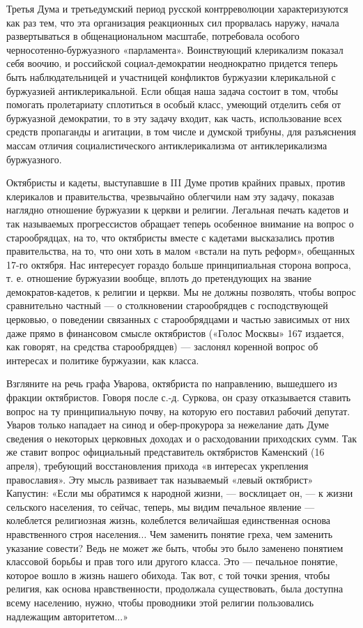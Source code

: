 \documentclass[12pt]{article}
\newcommand{\parnum}{(\arabic{parcount})}
\newcounter{parcount}
\newenvironment{parnumbers}{%
  \par%
  \everypar{\noindent \stepcounter{parcount}\marginpar[]{\parnum}}%
}{}
\begin{document}
\begin{parnumbers}
Третья Дума и третьедумский период русской контрреволюции характеризуются как раз тем, что эта организация реакционных сил прорвалась наружу, начала развертываться в общенациональном масштабе, потребовала особого черносотенно-буржуазного «парламента». Воинствующий клерикализм показал себя воочию, и российской социал-демократии неоднократно придется теперь быть наблюдательницей и участницей конфликтов буржуазии клерикальной с буржуазией антиклерикальной. Если общая наша задача состоит в том, чтобы помогать пролетариату сплотиться в особый класс, умеющий отделить себя от буржуазной демократии, то в эту задачу входит, как часть, использование всех средств пропаганды и агитации, в том числе и думской трибуны, для разъяснения массам отличия социалистического антиклерикализма от антиклерикализма буржуазного.

Октябристы и кадеты, выступавшие в III Думе против крайних правых, против клерикалов и правительства, чрезвычайно облегчили нам эту задачу, показав наглядно отношение буржуазии к церкви и религии. Легальная печать кадетов и так называемых прогрессистов обращает теперь особенное внимание на вопрос о старообрядцах, на то, что октябристы вместе с кадетами высказались против правительства, на то, что они хоть в малом «встали на путь реформ», обещанных 17-го октября. Нас интересует гораздо больше принципиальная сторона вопроса, т. е. отношение буржуазии вообще, вплоть до претендующих на звание демократов-кадетов, к религии и церкви. Мы не должны позволять, чтобы вопрос сравнительно частный — о столкновении старообрядцев с господствующей церковью, о поведении связанных с старообрядцами и частью зависимых от них даже прямо в финансовом смысле октябристов («Голос Москвы» 167 издается, как говорят, на средства старообрядцев) — заслонял коренной вопрос об интересах и политике буржуазии, как класса.

Взгляните на речь графа Уварова, октябриста по направлению, вышедшего из фракции октябристов. Говоря после с.-д. Суркова, он сразу отказывается ставить вопрос на ту принципиальную почву, на которую его поставил рабочий депутат. Уваров только нападает на синод и обер-прокурора за нежелание дать Думе сведения о некоторых церковных доходах и о расходовании приходских сумм. Так же ставит вопрос официальный представитель октябристов Каменский (16 апреля), требующий восстановления прихода «в интересах укрепления православия». Эту мысль развивает так называемый «левый октябрист» Капустин: «Если мы обратимся к народной жизни, — восклицает он, — к жизни сельского населения, то сейчас, теперь, мы видим печальное явление — колеблется религиозная жизнь, колеблется величайшая единственная основа нравственного строя населения... Чем заменить понятие греха, чем заменить указание совести? Ведь не может же быть, чтобы это было заменено понятием классовой борьбы и прав того или другого класса. Это — печальное понятие, которое вошло в жизнь нашего обихода. Так вот, с той точки зрения, чтобы религия, как основа нравственности, продолжала существовать, была доступна всему населению, нужно, чтобы проводники этой религии пользовались надлежащим авторитетом...»


\end{parnumbers}
\end{document}
